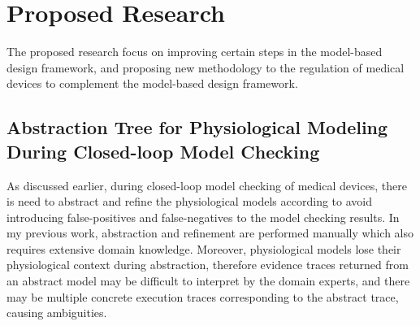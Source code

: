\documentclass[a4paper,11pt]{article}
\begin{document}
\section{Proposed Research}
The proposed research focus on improving certain steps in the model-based design framework, and proposing new methodology to the regulation of medical devices to complement the model-based design framework.
\subsection{Abstraction Tree for Physiological Modeling During Closed-loop Model Checking}
As discussed earlier, during closed-loop model checking of medical devices, there is need to abstract and refine the physiological models according to avoid introducing false-positives and false-negatives to the model checking results.
In my previous work, abstraction and refinement are performed manually which also requires extensive domain knowledge.
Moreover, physiological models lose their physiological context during abstraction, therefore evidence traces returned from an abstract model may be difficult to interpret by the domain experts, and there may be multiple concrete execution traces corresponding to the abstract trace, causing ambiguities.
\end{document}

